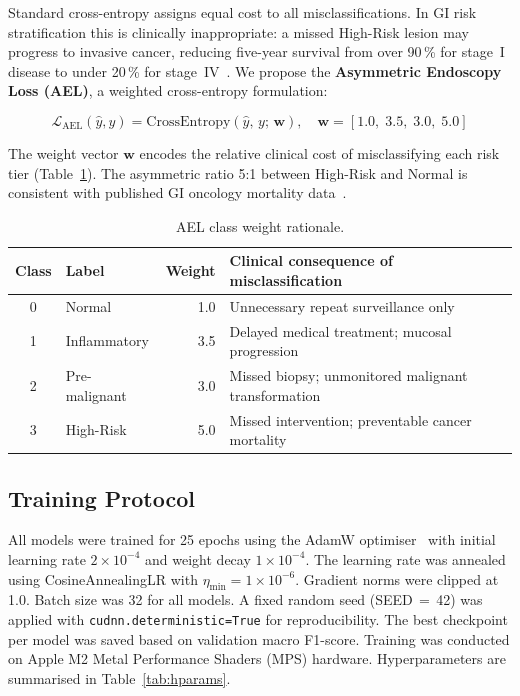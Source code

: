 \documentclass[10pt,a4paper,twocolumn]{article}
\begin{document}
Standard cross-entropy assigns equal cost to all misclassifications. In GI
risk stratification this is clinically inappropriate: a missed High-Risk
lesion may progress to invasive cancer, reducing five-year survival from
over 90\,\% for stage~I disease to under 20\,\% for
stage~IV~\citep{Sung2021}. We propose the \textbf{Asymmetric Endoscopy Loss
(AEL)}, a weighted cross-entropy formulation:

\begin{equation}
  \mathcal{L}_{\text{AEL}}(\hat{y}, y) =
    \text{CrossEntropy}(\hat{y},\, y;\, \mathbf{w}), \quad
  \mathbf{w} = [1.0,\; 3.5,\; 3.0,\; 5.0]
  \label{eq:ael}
\end{equation}

The weight vector $\mathbf{w}$ encodes the relative clinical cost of
misclassifying each risk tier (Table~\ref{tab:ael_weights}). The asymmetric
ratio 5:1 between High-Risk and Normal is consistent with published GI
oncology mortality data~\citep{Rawla2019}.

\begin{table}[htbp]
\centering
\caption{AEL class weight rationale.}
\label{tab:ael_weights}
\begin{tabular}{clr p{9cm}}
\toprule
\textbf{Class} & \textbf{Label} & \textbf{Weight} &
\textbf{Clinical consequence of misclassification}\\
\midrule
0 & Normal        & 1.0 & Unnecessary repeat surveillance only\\
1 & Inflammatory  & 3.5 & Delayed medical treatment; mucosal progression\\
2 & Pre-malignant & 3.0 & Missed biopsy; unmonitored malignant transformation\\
3 & High-Risk     & 5.0 & Missed intervention; preventable cancer mortality\\
\bottomrule
\end{tabular}
\end{table}

\subsection{Training Protocol}
\label{sec:training}

All models were trained for 25 epochs using the AdamW
optimiser~\citep{Loshchilov2019} with initial learning rate
$2\!\times\!10^{-4}$ and weight decay $1\!\times\!10^{-4}$. The learning
rate was annealed using CosineAnnealingLR with
$\eta_{\min}=1\!\times\!10^{-6}$. Gradient norms were clipped at 1.0. Batch
size was 32 for all models. A fixed random seed (SEED\,$=$\,42) was applied
with \texttt{cudnn.deterministic=True} for reproducibility. The best
checkpoint per model was saved based on validation macro F1-score. Training
was conducted on Apple M2 Metal Performance Shaders (MPS) hardware.
Hyperparameters are summarised in Table~\ref{tab:hparams}.
\end{document}
